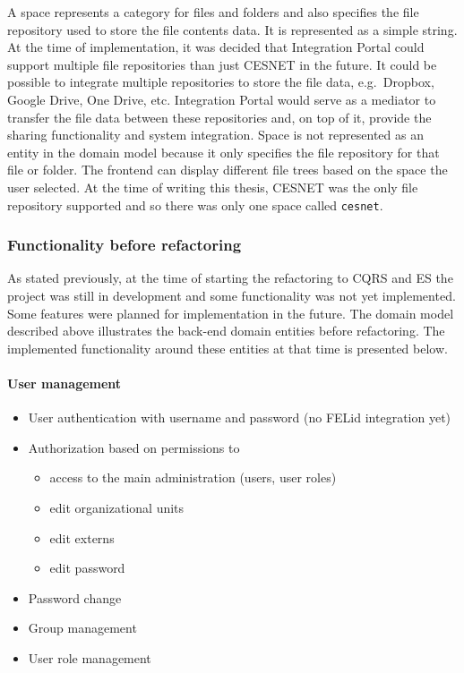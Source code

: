 \documentclass{book}
\begin{document}
A space represents a category for files and folders and also specifies
the file repository used to store the file contents data. It is
represented as a simple string. At the time of implementation, it was
decided that Integration Portal could support multiple file repositories
than just CESNET in the future. It could be possible to integrate
multiple repositories to store the file data, e.g.~Dropbox, Google
Drive, One Drive, etc. Integration Portal would serve as a mediator to
transfer the file data between these repositories and, on top of it,
provide the sharing functionality and system integration. Space is not
represented as an entity in the domain model because it only specifies
the file repository for that file or folder. The frontend can display
different file trees based on the space the user selected. At the time
of writing this thesis, CESNET was the only file repository supported
and so there was only one space called \texttt{cesnet}.


\subsubsection{Functionality before
refactoring}\label{functionality-before-refactoring}

As stated previously, at the time of starting the refactoring to CQRS
and ES the project was still in development and some functionality was
not yet implemented. Some features were planned for implementation in
the future. The domain model described above illustrates the back-end
domain entities before refactoring. The implemented functionality around
these entities at that time is presented below.

\paragraph{User management}\label{user-management}

\begin{itemize}
\tightlist
\item
  User authentication with username and password (no FELid integration
  yet)
\item
  Authorization based on permissions to

  \begin{itemize}
  \tightlist
  \item
    access to the main administration (users, user roles)
  \item
    edit organizational units
  \item
    edit externs
  \item
    edit password
  \end{itemize}
\item
  Password change
\item
  Group management
\item
  User role management
\end{itemize}
\end{document}
